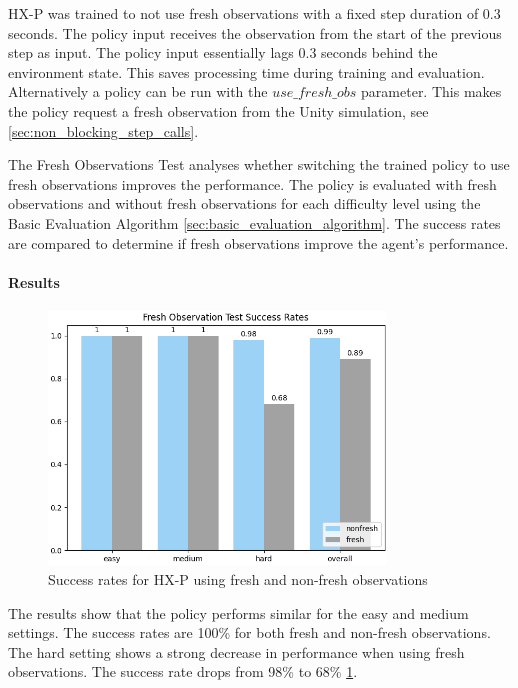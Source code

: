 \ac{HX-P} was trained to not use fresh observations with a fixed step duration of 0.3 seconds. The policy input receives the observation from the start of the previous step as input. The policy input essentially lags 0.3 seconds behind the environment state. This saves processing time during training and evaluation. Alternatively a policy can be run with the $use\_fresh\_obs$ parameter. This makes the policy request a fresh observation from the Unity simulation, see \ref{sec:non_blocking_step_calls}.

The Fresh Observations Test analyses whether switching the trained policy to use fresh observations improves the performance. The policy is evaluated with fresh observations and without fresh observations for each difficulty level using the Basic Evaluation Algorithm \ref{sec:basic_evaluation_algorithm}. The success rates are compared to determine if fresh observations improve the agent's performance.

\paragraph{Results}

\begin{figure}
    \centering
    \includegraphics[width=0.8\textwidth]{Bilder/notebook_images/hardDistanceMixedLight_eval_freshNonFresh_success_rates_barplot.png}
    \caption{Success rates for \ac{HX-P} using fresh and non-fresh observations}
    \label{fig:fresh_observations_test_result}
\end{figure}

The results show that the policy performs similar for the easy and medium settings. The success rates are 100\% for both fresh and non-fresh observations. The hard setting shows a strong decrease in performance when using fresh observations. The success rate drops from 98\% to 68\% \ref{fig:fresh_observations_test_result}.

